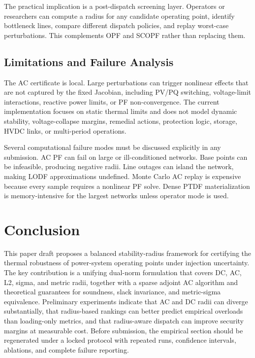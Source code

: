 \documentclass[11pt]{article}
\begin{document}
The practical implication is a post-dispatch screening layer. Operators or researchers can compute a radius for any candidate operating point, identify bottleneck lines, compare different dispatch policies, and replay worst-case perturbations. This complements OPF and SCOPF rather than replacing them.

\subsection{Limitations and Failure Analysis}

The AC certificate is local. Large perturbations can trigger nonlinear effects that are not captured by the fixed Jacobian, including PV/PQ switching, voltage-limit interactions, reactive power limits, or PF non-convergence. The current implementation focuses on static thermal limits and does not model dynamic stability, voltage-collapse margins, remedial actions, protection logic, storage, HVDC links, or multi-period operations.

Several computational failure modes must be discussed explicitly in any submission. AC PF can fail on large or ill-conditioned networks. Base points can be infeasible, producing negative radii. Line outages can island the network, making LODF approximations undefined. Monte Carlo AC replay is expensive because every sample requires a nonlinear PF solve. Dense PTDF materialization is memory-intensive for the largest networks unless operator mode is used.

\section{Conclusion}

This paper draft proposes a balanced stability-radius framework for certifying the thermal robustness of power-system operating points under injection uncertainty. The key contribution is a unifying dual-norm formulation that covers DC, AC, L2, sigma, and metric radii, together with a sparse adjoint AC algorithm and theoretical guarantees for soundness, slack invariance, and metric-sigma equivalence. Preliminary experiments indicate that AC and DC radii can diverge substantially, that radius-based rankings can better predict empirical overloads than loading-only metrics, and that radius-aware dispatch can improve security margins at measurable cost. Before submission, the empirical section should be regenerated under a locked protocol with repeated runs, confidence intervals, ablations, and complete failure reporting.
\end{document}
